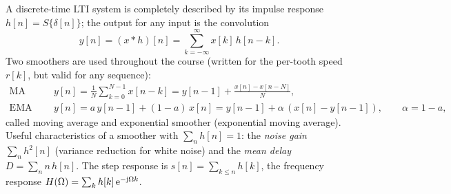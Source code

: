 A discrete-time LTI system is completely described by its impulse response
$h[n]=S\{\delta[n]\}$; the output for any input is the convolution
\[
  y[n]=(x*h)[n]=\sum_{k=-\infty}^{\infty}x[k]\,h[n-k] .
\]
Two smoothers are used throughout the course (written for the per-tooth speed
$r[k]$, but valid for any sequence):
\begin{align*}
  \text{MA (FIR):}\quad & y[n]=\frac1N\sum_{k=0}^{N-1}x[n-k]
     = y[n-1]+\frac{x[n]-x[n-N]}{N},\\
  \text{EMA (IIR):}\quad & y[n]=a\,y[n-1]+(1-a)\,x[n]
     = y[n-1]+\alpha\,(x[n]-y[n-1]),\qquad \alpha=1-a,
\end{align*}
called moving average and exponential smoother (exponential moving average).
Useful characteristics of a smoother with $\sum_n h[n]=1$: the \emph{noise gain}
$\sum_n h^2[n]$ (variance reduction for white noise) and the \emph{mean delay}
$D=\sum_n n\,h[n]$. The step response is $s[n]=\sum_{k\le n}h[k]$, the
frequency response $H(\Omega)=\sum_k h[k]\,\mathrm{e}^{-\mathrm{j}\Omega k}$.

